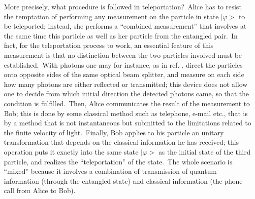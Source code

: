 \documentclass[12pt,onecolumn]{article}%
\begin{document}
More precisely, what procedure is followed in teleportation?\ Alice has to
resist the temptation of performing any measurement on the particle in state
$|\varphi>$ to be teleported; instead, she performs a ``combined
measurement'' that involves at the same time this particle as well as her
particle from the entangled pair.\ In fact, for the teleportation process to
work, an essential feature of this measurement is that no distinction between
the two particles involved must be established.\ With photons one may for
instance, as in ref. \cite{teleport-exp}, direct the particles onto opposite
sides of the same optical beam splitter, and measure on each side how many
photons are either reflected or transmitted; this device does not allow one to
decide from which initial direction the detected photons came, so that the
condition is fulfilled.\ Then, Alice communicates the result of the
measurement to Bob; this is done by some classical method such as telephone,
e-mail etc., that is by a method that is not instantaneous but submitted to
the limitations related to the finite velocity of light.\ Finally, Bob applies
to his particle an unitary transformation that depends on the classical
information he has received; this operation puts it exactly into the same
state $|\varphi>$ as the initial state of the third particle, and realizes
the ``teleportation'' of the state.\ The whole scenario is ``mixed'' because
it involves a combination of transmission of quantum information (through the
entangled state) and classical information (the phone call from Alice to Bob).
\end{document}
